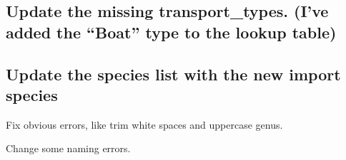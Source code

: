 \documentclass[]{article}
\newenvironment{Shaded}{\begin{snugshade}}{\end{snugshade}}
\newcommand{\DataTypeTok}[1]{\textcolor[rgb]{0.13,0.29,0.53}{#1}}
\newcommand{\KeywordTok}[1]{\textcolor[rgb]{0.13,0.29,0.53}{\textbf{#1}}}
\newcommand{\NormalTok}[1]{#1}
\newcommand{\OperatorTok}[1]{\textcolor[rgb]{0.81,0.36,0.00}{\textbf{#1}}}
\newcommand{\StringTok}[1]{\textcolor[rgb]{0.31,0.60,0.02}{#1}}
\begin{document}
\hypertarget{update-the-missing-transport_types.-ive-added-the-boat-type-to-the-lookup-table}{%
\subsection{Update the missing transport\_types. (I've added the
``Boat'' type to the lookup
table)}\label{update-the-missing-transport_types.-ive-added-the-boat-type-to-the-lookup-table}}

\begin{Shaded}
\end{Shaded}

\hypertarget{update-the-species-list-with-the-new-import-species}{%
\subsection{Update the species list with the new import
species}\label{update-the-species-list-with-the-new-import-species}}

Fix obvious errors, like trim white spaces and uppercase genus.

\begin{Shaded}
\end{Shaded}

Change some naming errors.
\end{document}
